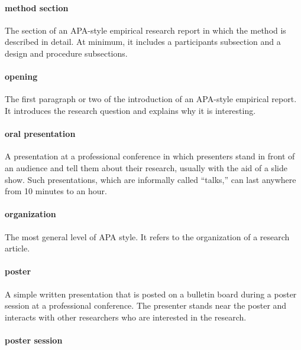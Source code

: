 \documentclass[
]{krantz}
\begin{document}
\paragraph*{method section}\label{method-section}

The section of an APA-style empirical research report in which the method is described in detail. At minimum, it includes a participants subsection and a design and procedure subsections.

\paragraph*{opening}\label{opening}

The first paragraph or two of the introduction of an APA-style empirical report. It introduces the research question and explains why it is interesting.

\paragraph*{oral presentation}\label{oral-presentation}

A presentation at a professional conference in which presenters stand in front of an audience and tell them about their research, usually with the aid of a slide show. Such presentations, which are informally called ``talks,'' can last anywhere from 10 minutes to an hour.

\paragraph*{organization}\label{organization-1}

The most general level of APA style. It refers to the organization of a research article.

\paragraph*{poster}\label{poster}

A simple written presentation that is posted on a bulletin board during a poster session at a professional conference. The presenter stands near the poster and interacts with other researchers who are interested in the research.

\paragraph*{poster session}\label{poster-session}
\end{document}
